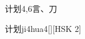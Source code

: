 \begin{entry}{计划}{4,6}{⾔、⼑}
  \begin{phonetics}{计划}{ji4hua4}[][HSK 2]
  \end{phonetics}
\end{entry}
